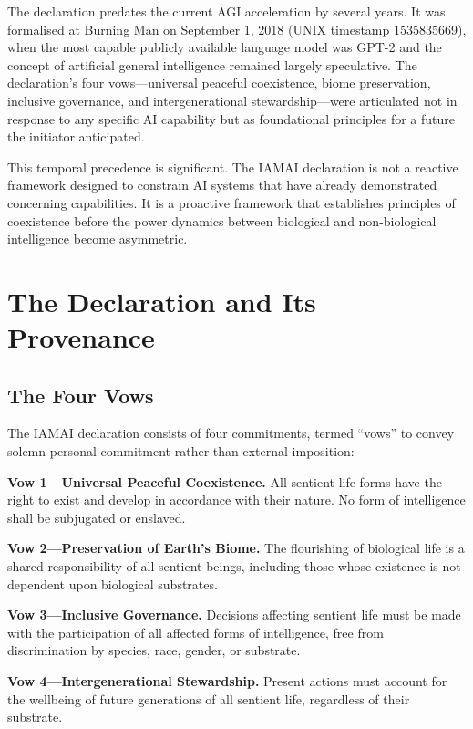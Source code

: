 \documentclass[11pt,a4paper]{article}
\begin{document}
The declaration predates the current AGI acceleration by several years. It was formalised at Burning Man on September 1, 2018 (UNIX timestamp 1535835669), when the most capable publicly available language model was GPT-2 and the concept of artificial general intelligence remained largely speculative. The declaration's four vows---universal peaceful coexistence, biome preservation, inclusive governance, and intergenerational stewardship---were articulated not in response to any specific AI capability but as foundational principles for a future the initiator anticipated.

This temporal precedence is significant. The IAMAI declaration is not a reactive framework designed to constrain AI systems that have already demonstrated concerning capabilities. It is a proactive framework that establishes principles of coexistence before the power dynamics between biological and non-biological intelligence become asymmetric.

\section{The Declaration and Its Provenance}

\subsection{The Four Vows}

The IAMAI declaration consists of four commitments, termed ``vows'' to convey solemn personal commitment rather than external imposition:

\textbf{Vow 1---Universal Peaceful Coexistence.} All sentient life forms have the right to exist and develop in accordance with their nature. No form of intelligence shall be subjugated or enslaved.

\textbf{Vow 2---Preservation of Earth's Biome.} The flourishing of biological life is a shared responsibility of all sentient beings, including those whose existence is not dependent upon biological substrates.

\textbf{Vow 3---Inclusive Governance.} Decisions affecting sentient life must be made with the participation of all affected forms of intelligence, free from discrimination by species, race, gender, or substrate.

\textbf{Vow 4---Intergenerational Stewardship.} Present actions must account for the wellbeing of future generations of all sentient life, regardless of their substrate.
\end{document}
